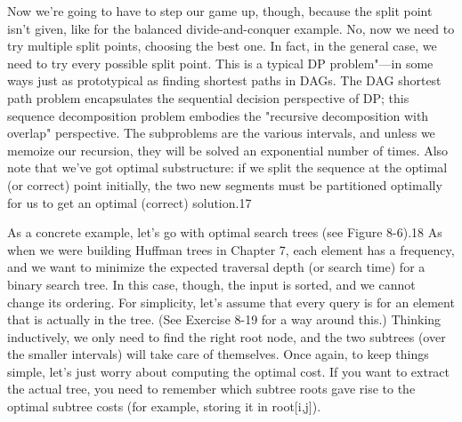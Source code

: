 Now we're going to have to step our game up, though, because the split point isn't given, like for
the balanced divide-and-conquer example. No, now we need to try multiple split points, choosing
the best one. In fact, in the general case, we need to try every possible split point. This is a typical DP problem"---in some ways just as prototypical as finding shortest paths in DAGs. The DAG shortest path problem encapsulates the sequential decision perspective of DP; this sequence decomposition problem embodies the "recursive decomposition with overlap" perspective. The subproblems are the various intervals, and unless we memoize our recursion, they will be solved an exponential number of times. Also note that we've got optimal substructure: if we split the sequence at the optimal (or correct) point initially, the two new segments must be partitioned optimally for us to get an optimal (correct) solution.17

As a concrete example, let's go with optimal search trees (see Figure 8-6).18 As when we were
building Huffman trees in Chapter 7, each element has a frequency, and we want to minimize the
expected traversal depth (or search time) for a binary search tree. In this case, though, the input is sorted, and we cannot change its ordering. For simplicity, let's assume that every query is for an element that is actually in the tree. (See Exercise 8-19 for a way around this.) Thinking inductively, we only need to find the right root node, and the two subtrees (over the smaller intervals) will take care of themselves. Once again, to keep things simple, let's just worry about computing the optimal cost. If you want to extract the actual tree, you need to remember which subtree roots gave rise to the optimal subtree costs (for example, storing it in root[i,j]).

